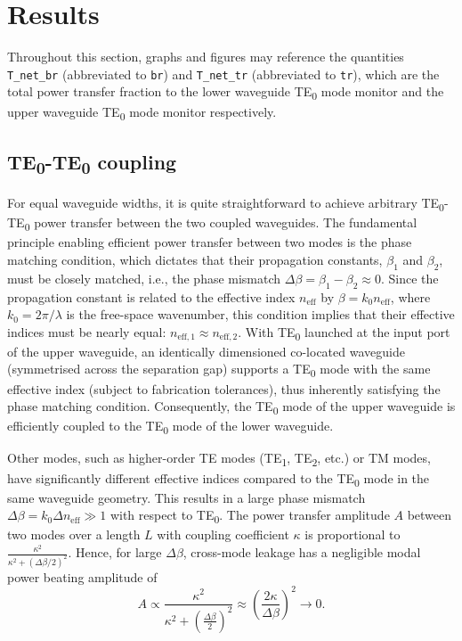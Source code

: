 \documentclass[10pt, a4paper]{article}
\begin{document}
\section{Results}

Throughout this section, graphs and figures may reference the quantities \texttt{T\_net\_br} (abbreviated to \texttt{br}) and \texttt{T\_net\_tr} (abbreviated to \texttt{tr}),
which are the total power transfer fraction to the lower waveguide TE\textsubscript{0} mode monitor and the upper waveguide TE\textsubscript{0} mode monitor respectively.

\subsection{TE\textsubscript{0}-TE\textsubscript{0} coupling}

For equal waveguide widths, it is quite straightforward to achieve arbitrary TE\textsubscript{0}-TE\textsubscript{0} power transfer between the two coupled waveguides.
The fundamental principle enabling efficient power transfer between two modes is the phase matching condition,
which dictates that their propagation constants, \(\beta_1\) and \(\beta_2\), must be closely matched, i.e., the phase mismatch \(\Delta\beta = \beta_1 - \beta_2 \approx 0\).
Since the propagation constant is related to the effective index \(n_\text{eff}\) by \(\beta = k_0 n_\text{eff}\), where \(k_0 = 2\pi/\lambda\) is the free-space wavenumber,
this condition implies that their effective indices must be nearly equal: \(n_{\text{eff},1} \approx n_{\text{eff},2}\).
With TE\textsubscript{0} launched at the input port of the upper waveguide, an identically dimensioned co-located waveguide (symmetrised across the separation gap) supports a TE\textsubscript{0} mode with the same effective index
(subject to fabrication tolerances), thus inherently satisfying the phase matching condition.
Consequently, the TE\textsubscript{0} mode of the upper waveguide is efficiently coupled to the TE\textsubscript{0} mode of the lower waveguide.

Other modes, such as higher-order TE modes (TE\textsubscript{1}, TE\textsubscript{2}, etc.) or TM modes, have significantly different effective indices compared to the TE\textsubscript{0} mode in the same waveguide geometry.
This results in a large phase mismatch \(\Delta\beta=k_0\Delta n_\text{eff}\gg 1\) with respect to TE\textsubscript{0}.
The power transfer amplitude \(A\) between two modes over a length \(L\) with coupling coefficient \(\kappa\) is proportional to \(\frac{\kappa^2}{\kappa^2 + {(\Delta\beta/2)}^2}\).
Hence, for large \(\Delta\beta\), cross-mode leakage has a negligible modal power beating amplitude of
\[A\propto\frac{\kappa^2}{\kappa^2+{(\frac{\Delta\beta}{2})}^2}\approx{\left(\frac{2\kappa}{\Delta\beta}\right)}^2\to 0.\]
\end{document}
